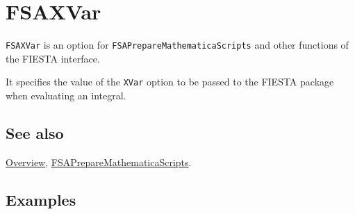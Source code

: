 \documentclass[../FeynHelpersManual.tex]{subfiles}
\begin{document}
\begin{Shaded}
\begin{Highlighting}[]
 
\end{Highlighting}
\end{Shaded}

\hypertarget{fsaxvar}{
\section{FSAXVar}\label{fsaxvar}}

\texttt{FSAXVar} is an option for \texttt{FSAPrepareMathematicaScripts}
and other functions of the FIESTA interface.

It specifies the value of the \texttt{XVar} option to be passed to the
FIESTA package when evaluating an integral.

\subsection{See also}

\hyperlink{toc}{Overview},
\hyperlink{fsapreparemathematicascripts}{FSAPrepareMathematicaScripts}.

\subsection{Examples}
\end{document}
